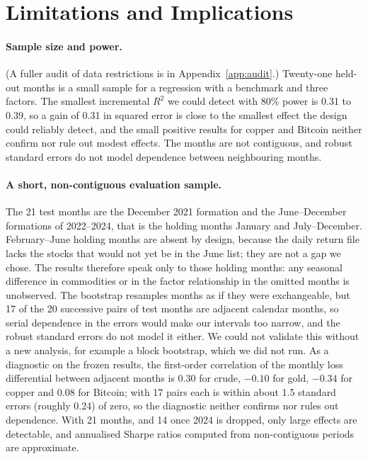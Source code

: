 \documentclass[11pt]{article}
\begin{document}
\section{Limitations and Implications}
\label{sec:limits}

\paragraph{Sample size and power.} (A fuller audit of data restrictions is in Appendix~\ref{app:audit}.) Twenty-one held-out months is a small sample for a regression with a benchmark and three factors. The smallest incremental $R^2$ we could detect with 80\% power is 0.31 to 0.39, so a gain of 0.31 in squared error is close to the smallest effect the design could reliably detect, and the small positive results for copper and Bitcoin neither confirm nor rule out modest effects. The months are not contiguous, and robust standard errors do not model dependence between neighbouring months.

\paragraph{A short, non-contiguous evaluation sample.} The 21 test months are the December 2021 formation and the June--December formations of 2022--2024, that is the holding months January and July--December. February--June holding months are absent by design, because the daily return file lacks the stocks that would not yet be in the June list; they are not a gap we chose. The results therefore speak only to those holding months: any seasonal difference in commodities or in the factor relationship in the omitted months is unobserved. The bootstrap resamples months as if they were exchangeable, but 17 of the 20 successive pairs of test months are adjacent calendar months, so serial dependence in the errors would make our intervals too narrow, and the robust standard errors do not model it either. We could not validate this without a new analysis, for example a block bootstrap, which we did not run. As a diagnostic on the frozen results, the first-order correlation of the monthly loss differential between adjacent months is 0.30 for crude, $-0.10$ for gold, $-0.34$ for copper and 0.08 for Bitcoin; with 17 pairs each is within about 1.5 standard errors (roughly 0.24) of zero, so the diagnostic neither confirms nor rules out dependence. With 21 months, and 14 once 2024 is dropped, only large effects are detectable, and annualised Sharpe ratios computed from non-contiguous periods are approximate.
\end{document}
